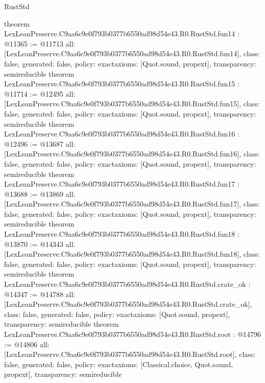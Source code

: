 \begin{lexlean}{RustStd}
\begin{coremodule}
{}
theorem LexLeanPreserve.C9aa6c9e0f793b0377b6550ad98d54e43.R0.RustStd.fun14 : @11365 := @11713 {
  all: [LexLeanPreserve.C9aa6c9e0f793b0377b6550ad98d54e43.R0.RustStd.fun14],
  class: false,
  generated: false,
  policy: exact{axioms: [Quot.sound, propext]},
  transparency: semireducible
}
theorem LexLeanPreserve.C9aa6c9e0f793b0377b6550ad98d54e43.R0.RustStd.fun15 : @11714 := @12495 {
  all: [LexLeanPreserve.C9aa6c9e0f793b0377b6550ad98d54e43.R0.RustStd.fun15],
  class: false,
  generated: false,
  policy: exact{axioms: [Quot.sound, propext]},
  transparency: semireducible
}
theorem LexLeanPreserve.C9aa6c9e0f793b0377b6550ad98d54e43.R0.RustStd.fun16 : @12496 := @13687 {
  all: [LexLeanPreserve.C9aa6c9e0f793b0377b6550ad98d54e43.R0.RustStd.fun16],
  class: false,
  generated: false,
  policy: exact{axioms: [Quot.sound, propext]},
  transparency: semireducible
}
theorem LexLeanPreserve.C9aa6c9e0f793b0377b6550ad98d54e43.R0.RustStd.fun17 : @13688 := @13869 {
  all: [LexLeanPreserve.C9aa6c9e0f793b0377b6550ad98d54e43.R0.RustStd.fun17],
  class: false,
  generated: false,
  policy: exact{axioms: [Quot.sound, propext]},
  transparency: semireducible
}
theorem LexLeanPreserve.C9aa6c9e0f793b0377b6550ad98d54e43.R0.RustStd.fun18 : @13870 := @14343 {
  all: [LexLeanPreserve.C9aa6c9e0f793b0377b6550ad98d54e43.R0.RustStd.fun18],
  class: false,
  generated: false,
  policy: exact{axioms: [Quot.sound, propext]},
  transparency: semireducible
}
theorem LexLeanPreserve.C9aa6c9e0f793b0377b6550ad98d54e43.R0.RustStd.crate_ok : @14347 := @14788 {
  all: [LexLeanPreserve.C9aa6c9e0f793b0377b6550ad98d54e43.R0.RustStd.crate_ok],
  class: false,
  generated: false,
  policy: exact{axioms: [Quot.sound, propext]},
  transparency: semireducible
}
theorem LexLeanPreserve.C9aa6c9e0f793b0377b6550ad98d54e43.R0.RustStd.root : @14796 := @14806 {
  all: [LexLeanPreserve.C9aa6c9e0f793b0377b6550ad98d54e43.R0.RustStd.root],
  class: false,
  generated: false,
  policy: exact{axioms: [Classical.choice, Quot.sound, propext]},
  transparency: semireducible
}


\end{coremodule}
\end{lexlean}
